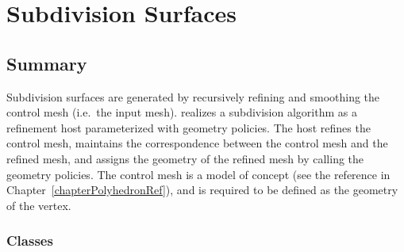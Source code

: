 
\chapter{Subdivision Surfaces}
\label{chapterSubdivisionRef}


\section*{Summary}

Subdivision surfaces are generated by recursively refining and smoothing 
the control mesh (i.e.~the input mesh).  
realizes a subdivision algorithm as a refinement host parameterized 
with geometry policies. The host refines the control mesh, maintains
the correspondence between the control mesh and the refined mesh, and
assigns the geometry of the refined mesh by calling the geometry policies.
The control mesh is a model of  concept (see the 
reference in Chapter~\ref{chapterPolyhedronRef}), 
and  is required to be defined as the geometry
of the vertex.


\subsection*{Classes}

\\ 
\\ 
\\ 
\\ 
\\ 
\\ 
\\ 
\\ 

